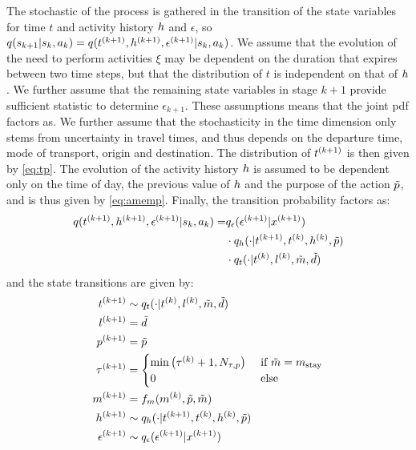 The stochastic of the process is gathered in the transition of the state variables for time $t$ and activity history $h$ and $\epsilon$, so $q(s_{k+1}|s_{k},a_k) = q(t^{(k+1)},h^{(k+1)},\epsilon^{(k+1)}| s_{k},a_k)$. We assume that the evolution of the need to perform activities $\xi$ may be dependent on the duration that expires between two time steps, but that the distribution of $t$ is independent on that of $h$. We further assume that the remaining state variables in stage $k+1$ provide sufficient statistic to determine $\epsilon_{k+1}$. These assumptions means that the joint pdf factors as. We further assume that the stochasticity in the time dimension only stems from uncertainty in travel times, and thus depends on the departure time, mode of transport, origin and destination. The distribution of $t^{(k+1)}$ is then given by \eqref{eq:tp}. The evolution of the activity history $h$ is assumed to be dependent only on the time of day, the previous value of $h$ and the purpose of the action $\tilde{p}$, and is thus given by \eqref{eq:amemp}. Finally, the transition probability factors as:
\begin{equation}
\begin{aligned}
	 q(t\ks{k+1},\amem\ks{k+1},\epsilon\ks{k+1}| \s{k},a_k) = & q_\epsilon(\epsilon\ks{k+1}|x\ks{k+1}) \\ &\cdot q_\amem(\cdot | t\ks{k+1},t\ks{k}, \amem\ks{k},\act{p})\\&\cdot q_t (\cdot | t\ks{k},l\ks{k},\act{m},\act{d})
\end{aligned}
\end{equation}
and the state transitions are given by:
\begin{subequations}
\begin{align}
t\ks{k+1} & \sim q_t (\cdot | t\ks{k},l\ks{k},\act{m},\act{d}) \label{eq:tp}\\
l\ks{k+1} &= \act{d} \\
p\ks{k+1} &= \act{p} \\
\atime\ks{k+1} & = \begin{cases}
                \min\big(\atime\ks{k} + 1,N_{\atime,p}\big) & \cif \act{m} = m_\text{stay} \\
                0 & \celse 
    \end{cases} \label{eq:atimeP} \\
    m\ks{k+1} &= f_m(m\ks{k},\act{p},\act{m}) \\
\amem\ks{k+1} & \sim q_\amem(\cdot | t\ks{k+1}, t\ks{k},\amem\ks{k},\act{p}) \label{eq:amemp} \\
\epsilon\ks{k+1} & \sim q_\epsilon(\epsilon\ks{k+1}|x\ks{k+1})
\end{align}
\end{subequations}


